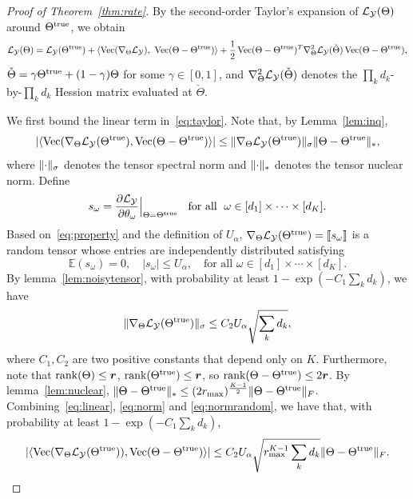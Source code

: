 \documentclass[11pt]{article}
\theoremstyle{plain}
\theoremstyle{definition}
\begin{document}
\begin{proof}[Proof of Theorem~\ref{thm:rate}]
By the second-order Taylor's expansion of $\mathcal{L}_{\mathcal{Y}}(\Theta)$ around $\Theta^{\mathrm{true}}$, we obtain
\begin{equation}\label{eq:taylor}
\flogl(\Theta)=\flogl(\trueT)+\langle\Vec(\fplogl),\ \Vec(\Theta-\trueT)\rangle+{1\over 2}\Vec(\Theta-\trueT)^T\fpplogl(\check\Theta)\Vec(\Theta-\trueT),
\end{equation}
$\check\Theta=\gamma\Theta^{\mathrm{true}}+(1-\gamma)\Theta$ for some $\gamma\in[0,1]$, and $\nabla^2_{\Theta}\mathcal{L}_{\mathcal{Y}}(\check\Theta)$ denotes the $\prod_kd_k$-by-$\prod_k d_k$ Hession matrix evaluated at $\check\Theta$.

We first bound the linear term in~\eqref{eq:taylor}. Note that, by Lemma~\ref{lem:inq},
\begin{equation}\label{eq:linear}
|\langle\operatorname{Vec}(\nabla_{\Theta}\mathcal{L}_{\mathcal{Y}}(\Theta^{\mathrm{true}}), \operatorname{Vec}(\Theta-\Theta^{\mathrm{true}})  \rangle|\leq \lVert\nabla_{\Theta}\mathcal{L}_{\mathcal{Y}}(\Theta^{\mathrm{true}})\rVert_\sigma \lVert\Theta-\Theta^{\mathrm{true}}\rVert_*,
\end{equation}
where $\lVert\cdot\rVert_\sigma$ denotes the tensor spectral norm and $\lVert\cdot\rVert_*$ denotes the tensor nuclear norm. Define
\[
s_\omega={\partial \mathcal{L}_{\mathcal{Y}}\over \partial \theta_\omega}\Big|_{\Theta=\Theta^{\mathrm{true}}} \;\; \textrm{ for all } \; \omega\in[d_1]\times\cdots\times [d_K].
\]
Based on~\eqref{eq:property} and the definition of $U_\alpha$, $\nabla_{\Theta}\mathcal{L}_{\mathcal{Y}}(\Theta^{\mathrm{true}})=\llbracket s_{\omega} \rrbracket$ is a random tensor whose entries are independently distributed satisfying
\begin{equation}\label{eq:norm}
\mathbb{E}(s_\omega)=0,\quad |s_\omega|\leq U_\alpha, \quad \text{for all }\omega\in[d_1]\times \cdots \times [d_K].
\end{equation}
By lemma~\ref{lem:noisytensor}, with probability at least $1-\exp(-C_1 \sum_kd_k)$, we have
\begin{equation}\label{eq:normrandom}
\lVert\nabla_{\Theta}\mathcal{L}_{\mathcal{Y}}(\Theta^{\mathrm{true}})\rVert_\sigma \leq C_2 U_\alpha\sqrt{\sum_k d_k},
\end{equation}
where $C_1, C_2$ are two positive constants that depend only on $K$. Furthermore, note that $\text{rank}(\Theta)\leq \bm{r}$, $\text{rank}(\Theta^{\mathrm{true}})\leq \bm{r}$, so $\text{rank}(\Theta-\Theta^{\mathrm{true}})\leq 2\bm{r}$. By lemma~\ref{lem:nuclear}, $\lVert\Theta-\Theta^{\mathrm{true}}\rVert_*\leq (2r_{\max})^{K-1\over 2}\lVert\Theta-\Theta^{\mathrm{true}}\rVert_F$. Combining~\eqref{eq:linear}, \eqref{eq:norm} and \eqref{eq:normrandom}, we have that, with probability at least $1-\exp(-C_1 \sum_kd_k)$,
\begin{equation}\label{eq:linearconclusion}
|\langle \operatorname{Vec}(\nabla_{\Theta}\mathcal{L}_{\mathcal{Y}}(\Theta^{\mathrm{true}})), \operatorname{Vec}(\Theta-\Theta^{\mathrm{true}})  \rangle | \leq C_2 U_\alpha  \sqrt{r_{\max}^{K-1} \sum_k d_k}  \lVert\Theta-\Theta^{\mathrm{true}}\rVert_F.
\end{equation}


\end{proof}
\end{document}
